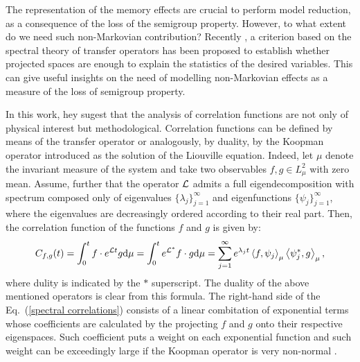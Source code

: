 \documentclass[12pt]{article}
\begin{document}
The representation of the memory effects are crucial to perform model reduction, as a consequence of the loss of the semigroup property. However, to what extent do we need such non-Markovian contribution? Recently \cite{chekroun2019c}, a criterion based on the spectral theory of transfer operators has been proposed to establish whether projected spaces are enough to explain the statistics of the desired variables. This can give useful insights on the need of modelling non-Markovian effects as a measure of the loss of semigroup property. 

In this work, hey sugest that the analysis of correlation functions are not only of physical interest but methodological. Correlation functions can be defined by means of the transfer operator or analogously, by duality, by the Koopman operator introduced as the solution of the Liouville equation. Indeed, let $\mu$ denote the invariant measure of the system and take two observables $f,g\in L^2_{\mu}$ with zero mean. Assume, further that the operator $\mathcal{L}$ admits a full eigendecomposition with spectrum composed only of eigenvalues $\{\lambda _j\}_{j=1}^{\infty}$ and eigenfunctions $\{\psi_j\}_{j=1}^{\infty}$, where the eigenvalues are decreasingly ordered according to their real part. Then, the correlation function of the functions $f$ and $g$ is given by:
\begin{equation}\label{spectral correlations}
C_{f,g}(t) = \int _{0}^tf\cdot e^{\mathcal{L} t}g\mathrm{d} \mu = \int _{0}^te^{\mathcal{L}^{\ast}}f\cdot g \mathrm{d} \mu= \sum_{j=1}^{\infty}e^{\lambda _jt}\left \langle f,\psi_j \right \rangle _{\mu}\left \langle \psi_j^{\ast},g \right \rangle _{\mu},
\end{equation}
where dulity is indicated by the $\ast$ superscript. The duality of the above mentioned operators is clear from this formula. The right-hand side of the Eq.~(\ref{spectral correlations}) consists of a linear combitation of exponential terms whose coefficients are calculated by the projecting $f$ and $g$ onto their respective eigenspaces. Such coefficient puts a weight on each exponential function and such weight can be exceedingly large if the Koopman operator is very non-normal \cite{trefethen2005}. 
\end{document}

